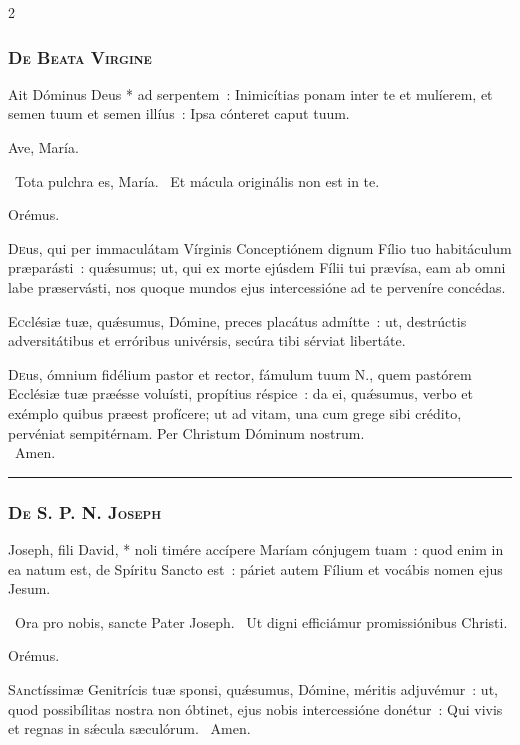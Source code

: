 \documentclass[9pt,twoside]{extarticle}
\begin{document}
\begin{multicols}{2}
\subsubsection*{\center \textsc{De Beata Virgine}}
\begin{tightlist}{}
\item {} Ait Dóminus Deus * ad serpentem~: Inimicítias ponam inter te et mulíerem, et semen tuum et semen illíus~: Ipsa cónteret caput tuum.
\item {\small {} Ave, María.}
\item {}~Tota pulchra es, María. ~Et mácula originális non est in te.
\item Orémus. \hfill {}
\end{tightlist}
\lettrine{D}eus, qui per immaculátam Vírginis Conceptiónem dignum Fílio tuo habitáculum præparásti~: quǽsumus; ut, qui ex morte ejúsdem Fílii tui prævísa, eam ab omni labe præservásti, nos quoque mundos ejus intercessióne ad te perveníre concédas.

\lettrine{E}cclésiæ tuæ, quǽsumus, Dómine, preces placátus admítte~: ut, destrúctis adversitátibus et erróribus univérsis, secúra tibi sérviat libertáte.

\lettrine{D}eus, ómnium fidélium pastor et rector, fámulum tuum N., quem pastórem Ecclésiæ tuæ præésse voluísti, propítius réspice~: da ei, quǽsumus, verbo et exémplo quibus præest profícere; ut ad vitam, una cum grege sibi crédito, pervéniat sempitérnam. Per Christum Dóminum nostrum.\\
~Amen.

\begin{center}\textcolor{red}{\rule{\linewidth}{0.5pt}} \end{center}

\subsubsection*{\center \textsc{De S. P. N. Joseph}}
\begin{tightlist}{}
\item {} Joseph, fili David, * noli timére accípere Maríam cónjugem tuam~: quod enim in ea natum est, de Spíritu Sancto est~: páriet autem Fílium et vocábis nomen ejus Jesum.
\item {}~Ora pro nobis, sancte Pater Joseph. ~Ut digni efficiámur promissiónibus Christi.
\item Orémus. \hfill {}
\end{tightlist}
\lettrine{S}anctíssimæ Genitrícis tuæ sponsi, quǽsumus, Dómine, méritis adjuvémur~: ut, quod possibílitas nostra non óbtinet, ejus nobis intercessióne donétur~: Qui vivis et regnas in sǽcula sæculórum. ~Amen.


\end{multicols}
\end{document}
